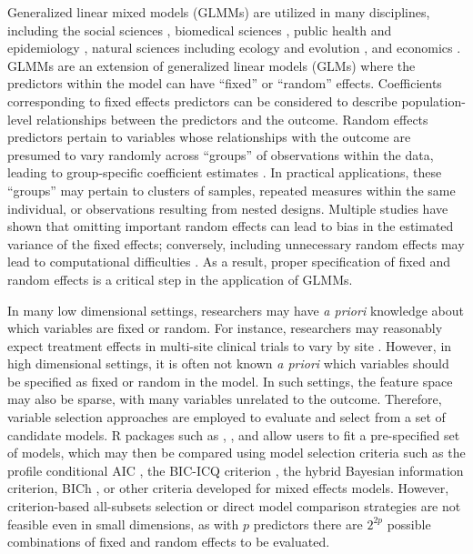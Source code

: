 Generalized linear mixed models (GLMMs) are utilized in many disciplines, including the social sciences \citep{schmidt2016random}, biomedical sciences \citep{fitzmaurice2012applied}, public health and epidemiology \citep{szyszkowicz2006use,kleinman2004generalized,dean2007generalized}, natural sciences including ecology and evolution \citep{bolker2009generalized}, and economics \citep{langford1994using}. 
GLMMs are an extension of generalized linear models (GLMs) where the predictors within the model can have ``fixed'' or ``random'' effects. Coefficients corresponding to fixed effects predictors can be considered to describe population-level relationships between the predictors and the outcome. Random effects predictors pertain to variables whose relationships with the outcome are presumed to vary randomly across ``groups'' of observations within the data, leading to group-specific coefficient estimates \citep{fitzmaurice2012applied}.
In practical applications, these ``groups'' may pertain to clusters of samples, repeated measures within the same individual, or observations resulting from nested designs.  Multiple studies have shown that omitting important random effects can lead to bias in the estimated variance of the fixed effects; conversely, including unnecessary random effects may lead to computational difficulties \citep{thompson2017bias, gurka2011avoiding, bondell2010joint}. As a result, proper specification of fixed and random effects is a critical step in the application of GLMMs.  

In many low dimensional settings, researchers may have \textit{a priori} knowledge about which variables are fixed or random. For instance, researchers may reasonably expect treatment effects in multi-site clinical trials to vary by site \citep{feaster2011modeling}. However, in high dimensional settings, it is often not known \textit{a priori} which variables should be specified as fixed or random in the model. In such settings, the feature space may also be sparse, with many variables unrelated to the outcome.  Therefore, variable selection approaches are employed to evaluate and select from a set of candidate models.   R packages such as  \citep{lme42007},  \citep{mcemglm2015}, and  \citep{mcmcglmm2010} allow users to fit a pre-specified set of models, which may then be compared using model selection criteria such as the profile conditional AIC \citep{donohue2011conditional}, the BIC-ICQ criterion \citep{BICq2011}, the hybrid Bayesian information criterion, BICh \citep{BICh2014}, or other criteria developed for mixed effects models. However, criterion-based all-subsets selection or direct model comparison strategies are not feasible even in small dimensions, as with $p$ predictors there are $2^{2p}$ possible combinations of fixed and random effects to be evaluated. 

